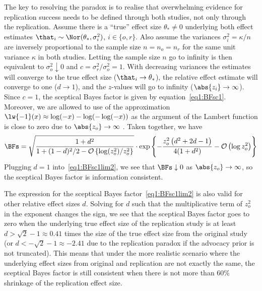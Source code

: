 The key to resolving the paradox is to realise that overwhelming evidence for
replication success needs to be defined through both studies, not only through
the replication. Assume there is a ``true'' effect size $\theta_{*} \neq 0$
underlying both effect estimates
$\that_{i} \sim \Nor(\theta_{*}, \sigma_{i}^{2})$, $i \in \{o, r\}$. Also assume
the variances $\sigma_{i}^{2} = \kappa/n$ are inversely proportional to the
sample size $n = n_{o} = n_{r}$ for the same unit variance $\kappa$ in both
studies. Letting the sample size $n$ go to infinity is then equivalent to
$\sigma_{o}^{2} \downarrow 0$ and $c = \sigma^{2}_{r}/\sigma^{2}_{o} = 1$. With
decreasing variances the estimates will
converge to the true effect size ($\that_{i} \to \theta_{*}$), the relative
effect estimate will converge to one ($d \to 1$), and the $z$-values will go to
infinity ($\abs{z_{i}} \to \infty$). Since $c = 1$, the sceptical Bayes factor
is given by equation~\eqref{eq1:BFsc1}. Moreover, we are allowed to use of the
approximation $\lw{-1}(x) \approx \log(-x) - \log(-\log(-x))$ as the argument of
the Lambert function is close to zero due to $\abs{z_{o}} \to \infty$ \citep[p.
350]{Corless1996}. Taken together, we have
\begin{align}
  \label{eq1:BFsc1lim2}
  \BFs =
  \sqrt{\frac{1 + d^{2}}{1 + (1 - d)^{2}/2 -
\mathcal{O}\left\{\log(z_{o}^{2})/z_{o}^{2}\right\}}} \cdot
  \exp\left\{-\frac{z_o^2\left(d^{2} + 2d - 1 \right)}{4(1 + d^{2})}
- \mathcal{O}\left(\log z_{o}^{2}\right)\right\}
\end{align}
Plugging $d = 1$ into~\eqref{eq1:BFsc1lim2}, we see that $\BFs \downarrow 0$ as
$\abs{z_{o}} \to \infty$, so the sceptical Bayes factor is information
consistent.

The expression for the sceptical Bayes factor~\eqref{eq1:BFsc1lim2} is also valid
for other relative effect sizes $d$. Solving for $d$ such that the
multiplicative term of $z_{o}^{2}$ in the exponent changes the sign, we see that
the sceptical Bayes factor goes to zero when the underlying true effect size of
the replication study is at least
$d > \sqrt{2} - 1 \approx 0.41$ times the size of the
true effect size from the original study (or
$d < -\sqrt{2} - 1 \approx -2.41$ due to the
replication paradox if the advocacy prior is not truncated). This means that
under the more realistic scenario where the underlying effect sizes from
original and replication are not exactly the same, the sceptical Bayes factor is
still consistent when there is not more than 60\% shrinkage of the replication
effect size.

